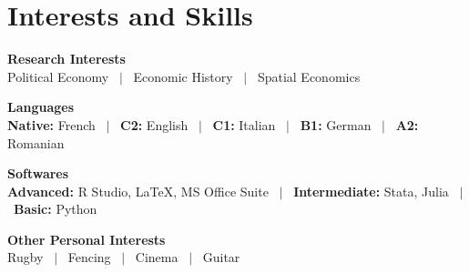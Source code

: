 \documentclass[a4paper,11pt]{article}
\begin{document}
\section{Interests and Skills}

\noindent
\newline
\textbf{Research Interests} \\
Political Economy \ $|$ \ Economic History \ $|$ \ Spatial Economics 

\noindent
\textbf{Languages} \\
\textbf{Native:} French \ $|$ \ \textbf{C2:} English \ $|$ \ \textbf{C1:} Italian \ $|$ \ \textbf{B1:} German \ $|$ \ \textbf{A2:} Romanian

\noindent
\textbf{Softwares} \\
\textbf{Advanced:} R Studio, \LaTeX, MS Office Suite \ $|$ \ \textbf{Intermediate:} Stata, Julia \ $|$ \ \textbf{Basic:} Python 

\noindent
\textbf{Other Personal Interests} \\
Rugby \ $|$ \ Fencing \ $|$ \ Cinema \ $|$ \ Guitar

\vfill
{}
\end{document}
